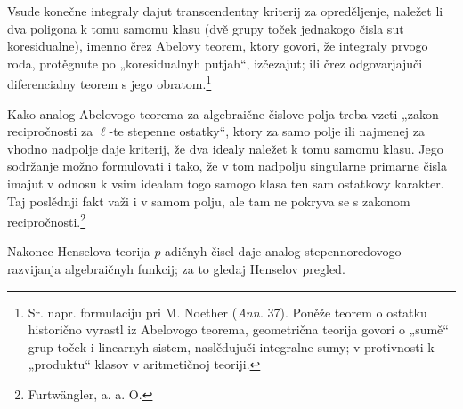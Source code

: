 \documentclass[11pt]{article}
\begin{document}
Vsude konečne integraly dajut transcendentny kriterij za opreděljenje, naležet li dva poligona k tomu samomu klasu (dvě grupy toček jednakogo čisla sut koresidualne), imenno črez Abelovy teorem, ktory govori, že integraly prvogo roda, protěgnute po „koresidualnyh putjah“, izčezajut; ili črez odgovarjajuči diferencialny teorem s jego obratom.\footnote{Sr. napr. formulaciju pri M. Noether (\emph{Ann.} 37). Poněže teorem o ostatku historično vyrastl iz Abelovogo teorema, geometrična teorija govori o „sumě“ grup toček i linearnyh sistem, naslědujuči integralne sumy; v protivnosti k „produktu“ klasov v aritmetičnoj teoriji.}

Kako analog Abelovogo teorema za algebraične čislove polja treba vzeti „zakon recipročnosti za \(\ell\)-te stepenne ostatky“, ktory za samo polje ili najmenej za vhodno nadpolje daje kriterij, že dva idealy naležet k tomu samomu klasu. Jego sodržanje možno formulovati i tako, že v tom nadpolju singularne primarne čisla imajut v odnosu k vsim idealam togo samogo klasa ten sam ostatkovy karakter. Taj poslědnji fakt važi i v samom polju, ale tam ne pokryva se s zakonom recipročnosti.\footnote{Furtwängler, a. a. O.}

Nakonec Henselova teorija \(p\)-adičnyh čisel daje analog stepennoredovogo razvijanja algebraičnyh funkcij; za to gledaj Henselov pregled.
\end{document}
